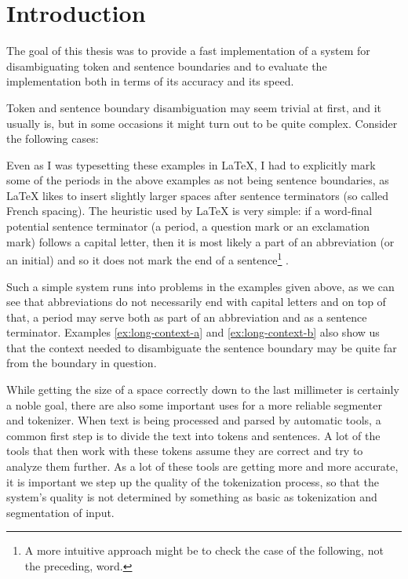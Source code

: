\chapter*{Introduction}

The goal of this thesis was to provide a fast implementation of a system for
disambiguating token and sentence boundaries and to evaluate the
implementation both in terms of its accuracy and its speed.

Token and sentence boundary disambiguation may seem trivial at first, and it
usually is, but in some occasions it might turn out to be quite complex.
Consider the following cases:

\begin{exe}
\end{exe}

Even as I was typesetting these examples in \LaTeX{}, I had to explicitly mark
some of the periods in the above examples as not being sentence boundaries, as
\LaTeX{} likes to insert slightly larger spaces after sentence terminators (so
called French spacing). The heuristic used by \LaTeX{} is very simple: if a
word-final potential sentence terminator (a period, a question mark or an
exclamation mark) follows a capital letter, then it is most likely a part of
an abbreviation (or an initial) and so it does not mark the end of a
sentence\footnote{A more intuitive approach might be to check the case of the
following, not the preceding, word.} \cite{web-latex}.

Such a simple system runs into problems in the examples given above, as we
can see that abbreviations do not necessarily end with capital letters and on
top of that, a period may serve both as part of an abbreviation and as a
sentence terminator. Examples \ref{ex:long-context-a} and
\ref{ex:long-context-b} also show us that the context needed to disambiguate
the sentence boundary may be quite far from the boundary in question.

While getting the size of a space correctly down to the last millimeter is
certainly a noble goal, there are also some important uses for a more reliable
segmenter and tokenizer. When text is being processed and parsed by automatic
tools, a common first step is to divide the text into tokens and sentences. A
lot of the tools that then work with these tokens assume they are correct and
try to analyze them further. As a lot of these tools are getting more and more
accurate, it is important we step up the quality of the tokenization process,
so that the system's quality is not determined by something as basic as
tokenization and segmentation of input. 

